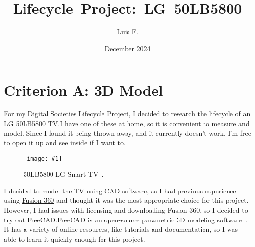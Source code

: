\documentclass[12pt, letterpaper]{article}
\newcommand{\img}[2]{
  \begin{figure}[H]
    \medskip
    \centering
    \texttt{[image: \#1]}
    \caption{#2}
    \medskip\label{fig:#1}
  \end{figure}
}
\begin{document}
\title{\vspace{-3em}\Large{\textbf{\mbox{\hspace{-0.25em}Lifecycle
Project: LG 50LB5800}}}} %
\author{\small{Luis F.}}
\date{\vspace{-0.5em}\small{December 2024}}

\maketitle


\vspace{-2em}

\tableofcontents

\section{Criterion A: 3D Model}

For my Digital Societies Lifecycle Project, I decided to research the
lifecycle of an LG 50LB5800 TV.\@ I have one of these at home, so it is
convenient to measure and model. Since I found it being thrown away,
and it currently doesn't work, I'm free to open it up and see inside
if I want to.

\img{lg-50LB5800}{50LB5800 LG Smart TV~\autocite{unknown-author-no-dateB}.}

I decided to model the TV using CAD software, as I had previous
experience using
\href{https://www.autodesk.com/products/fusion-360/overview}{Fusion
360} and thought it was the most appropriate choice for this project.
However, I had issues with licensing and downloading Fusion 360, so I
decided to try out FreeCAD.\@ \href{https://www.freecad.org}{FreeCAD}
is an open-source parametric 3D modeling
software~\autocite{jolahde-2018}. It has a variety of online
resources, like tutorials and documentation, so I was able to learn
it quickly enough for this project.
\end{document}
